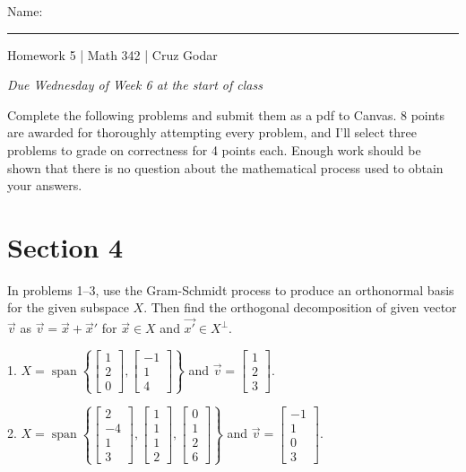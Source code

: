 \documentclass{article}
\begin{document}
\Large Name: \rule{2in}{0.15mm} \hfill Homework 5 | Math 342 | Cruz Godar \vspace{4pt} \normalsize

\textit{Due Wednesday of Week 6 at the start of class}

Complete the following problems and submit them as a pdf to Canvas. 8 points are awarded for thoroughly attempting every problem, and I'll select three problems to grade on correctness for 4 points each. Enough work should be shown that there is no question about the mathematical process used to obtain your answers.

\section{Section 4}

In problems 1--3, use the Gram-Schmidt process to produce an orthonormal basis for the given subspace $X$. Then find the orthogonal decomposition of given vector $\vec{v}$ as $\vec{v} = \vec{x} + \vec{x}'$ for $\vec{x} \in X$ and $\vec{x'} \in X^\perp$.

1. $X = \operatorname{span}\left\{ \left[\begin{array}{c} 1 \\ 2 \\ 0 \end{array}\right], \left[\begin{array}{c} -1 \\ 1 \\ 4 \end{array}\right] \right\}$ and $\vec{v} = \left[\begin{array}{c} 1 \\ 2 \\ 3 \end{array}\right]$.

2. $X = \operatorname{span}\left\{ \left[\begin{array}{c} 2 \\ -4 \\ 1 \\ 3 \end{array}\right], \left[\begin{array}{c} 1 \\ 1 \\ 1 \\ 2 \end{array}\right], \left[\begin{array}{c} 0 \\ 1 \\ 2 \\ 6 \end{array}\right] \right\}$ and $\vec{v} = \left[\begin{array}{c} -1 \\ 1 \\ 0 \\ 3 \end{array}\right]$.
\end{document}
